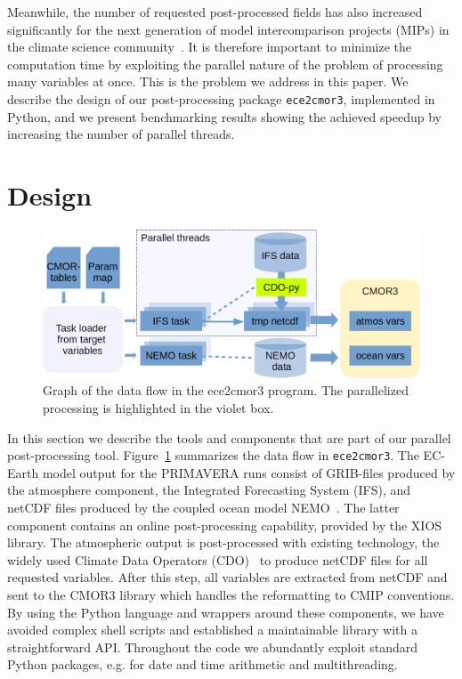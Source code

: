\documentclass[procedia]{easychair}
\begin{document}
Meanwhile, the number of requested post-processed fields has also increased 
significantly for the next generation of model intercomparison projects (MIPs) 
in the climate 
science community~\cite{eyri:2016b}.
It is therefore important to minimize the 
computation time by 
exploiting the parallel nature of the problem of processing many variables at 
once.
This is the problem we address in this paper.  
We describe the design of our post-processing package \texttt{ece2cmor3}, 
implemented in Python, and 
we present benchmarking results showing the achieved speedup by increasing the 
number of parallel threads.


\section{Design}

\begin{figure}[b!]
 \centering
 \includegraphics[width=\textwidth,clip]{ece2cmor3flowv3.png}
 \caption{Graph of the data flow in the ece2cmor3 program. The parallelized 
processing is highlighted in the violet box.}
\label{fig:design}
\end{figure}

In this section we describe the tools and components that 
are part of our parallel post-processing tool. Figure~\ref{fig:design} 
summarizes the data flow in \texttt{ece2cmor3}. 
% 
The EC-Earth model output for the PRIMAVERA runs consist of GRIB-files produced 
by the atmosphere component, the Integrated Forecasting System (IFS), and 
netCDF files produced by the coupled ocean model NEMO~\cite{NEMO}. The latter 
component 
contains an online post-processing capability, provided by the XIOS library. 
The 
atmospheric output is post-processed with existing technology, the widely used 
Climate Data Operators (CDO)~\cite{CDO} to produce netCDF files for all 
requested 
variables. After this step, all variables are extracted from netCDF and sent to 
the CMOR3 library \cite{CMOR} which handles the reformatting to CMIP 
conventions. By using the 
Python language and wrappers around these components, we have avoided 
complex shell scripts and established a maintainable library with a 
straightforward API. Throughout the code we abundantly exploit standard Python 
packages, e.g. for date and time arithmetic and multithreading.
\end{document}
